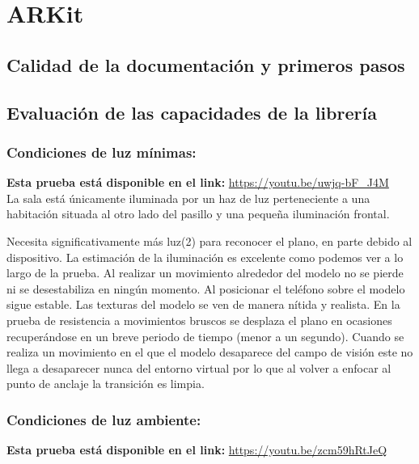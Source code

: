 \section{ARKit}
\subsection{Calidad de la documentación y primeros pasos}

\subsection{Evaluación de las capacidades de la librería}

\subsubsection{Condiciones de luz mínimas:}

\textbf{Esta prueba está disponible en el link:} \url{https://youtu.be/uwjq-bF_J4M}\\

La sala está únicamente iluminada por un haz de luz perteneciente a una habitación situada al otro lado del pasillo y una pequeña iluminación frontal.

Necesita significativamente más luz(2) para reconocer el plano, en parte debido al dispositivo. La estimación de la iluminación es excelente como podemos ver a lo largo de la prueba. Al realizar un movimiento alrededor del modelo no se pierde ni se desestabiliza en ningún momento. Al posicionar el teléfono sobre el modelo sigue estable. Las texturas del modelo se ven de manera nítida y realista. En la prueba de resistencia a movimientos bruscos se desplaza el plano en ocasiones recuperándose en un breve periodo de tiempo (menor a un segundo). Cuando se realiza un movimiento en el que el modelo desaparece del campo de visión este no llega a desaparecer nunca del entorno virtual por lo que al volver a enfocar al punto de anclaje la transición es limpia.

\subsubsection{Condiciones de luz ambiente:\\}

\textbf{Esta prueba está disponible en el link:} \url{https://youtu.be/zcm59hRtJeQ}\\

